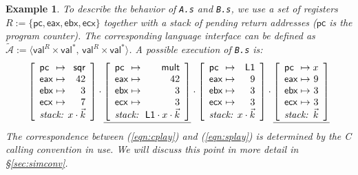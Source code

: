 \documentclass[11pt,oneside,draft]{book}
\newtheorem{example}[theorem]{Example}
\theoremstyle{definition}
\newcommand{\kw}[1]{\ensuremath{ \mathsf{#1} }}
\newcommand{\figsize}{}
\begin{document}
\begin{example}
To describe the behavior of \texttt{A.s} and \texttt{B.s},
we use a set of registers
$R := \{ \kw{pc}, \kw{eax}, \kw{ebx}, \kw{ecx} \}$
together with a stack of pending return addresses
($\kw{pc}$ is the program counter).
The corresponding language interface can be defined as
$\tilde{\mathcal{A}} :=
 \langle \kw{val}^R \times \kw{val}^*, \,
         \kw{val}^R \times \kw{val}^* \rangle$.
A possible execution of \texttt{B.s}
is: %
\begin{equation} \label{eqn:splay}
{
  \figsize
  \left[
    \begin{array}{l@{{} \mapsto {}}r}
      \kw{pc}  & \kw{sqr} \\
      \kw{eax} & 42 \\
      \kw{ebx} & 3 \\
      \kw{ecx} & 7 \\
      \multicolumn{2}{c}{\textit{stack: } \hfill x \cdot \vec{k}}
    \end{array}
  \right] \cdot
  \underline{
    \left[
      \begin{array}{l@{{} \mapsto {}}r}
        \kw{pc}  & \kw{mult} \\
        \kw{eax} & 42 \\
        \kw{ebx} & 3 \\
        \kw{ecx} & 3 \\
        \multicolumn{2}{c}{\textit{stack: } \: \kw{L1} \cdot x \cdot \vec{k}}
      \end{array}
    \right]} \cdot
  \left[
    \begin{array}{l@{{} \mapsto {}}r}
      \kw{pc}  & \kw{L1} \\
      \kw{eax} & 9 \\
      \kw{ebx} & 3 \\
      \kw{ecx} & 3 \\
      \multicolumn{2}{c}{\textit{stack: } \hfill x \cdot \vec{k}}
    \end{array}
  \right] \cdot
  \underline{
    \left[
      \begin{array}{l@{{} \mapsto {}}r}
        \kw{pc}  & x \\
        \kw{eax} & 9 \\
        \kw{ebx} & 3 \\
        \kw{ecx} & 3 \\
        \multicolumn{2}{c}{\textit{stack: } \hfill \vec{k}}
      \end{array}
    \right]}
}
\end{equation}
The correspondence between (\ref{eqn:cplay}) and (\ref{eqn:splay})
is determined by the C calling convention in use.
We will discuss this point in more detail in \S\ref{sec:simconv}.
\end{example}
\end{document}
